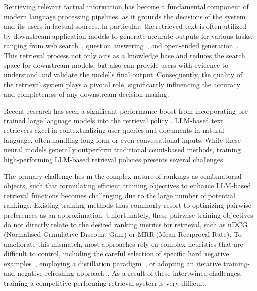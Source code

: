 \documentclass{article}
\begin{document}
Retrieving relevant factual information has become a fundamental component of modern language processing pipelines, as it grounds the decisions of the system and its users in factual sources. In particular, the retrieved text is often utilized by downstream application models to generate accurate outputs for various tasks, ranging from web search~\citep{Huang2013LearningDS}, question answering~\citep[]{Voorhees1999TheTQ, Chen2017ReadingWT, Karpukhin2020DensePR}, and open-ended generation~\citep{Lewis2020RetrievalAugmentedGF, Paranjape2021HindsightPT, Yu2022RetrievalaugmentedGA}.
This retrieval process not only acts as a knowledge base and reduces the search space for downstream models, but also can provide users with evidence to understand and validate the model's final output. Consequently, the quality of the retrieval system plays a pivotal role, significantly influencing the accuracy and completeness of any downstream decision making.

Recent research has seen a significant performance boost from incorporating pre-trained large language models into the retrieval policy \citep[e.g.,][]{Nogueira2019PassageRW, Lin2020PretrainedTF, Karpukhin2020DensePR}.
LLM-based text retrievers excel in contextualizing user queries and documents in natural language, often handling long-form or even conversational inputs. While these neural models generally outperform traditional count-based methods, training high-performing LLM-based retrieval policies presents several challenges. 


The primary challenge lies in the complex nature of rankings as combinatorial objects, such that formulating efficient training objectives to enhance LLM-based retrieval functions becomes challenging due to the large number of potential rankings. Existing training methods thus commonly resort to optimizing pairwise preferences as an approximation. Unfortunately, these pairwise training objectives do not directly relate to the desired ranking metrics for retrieval, such as nDCG (Normalised Cumulative Discount Gain) or MRR (Mean Reciprocal Rate). To ameliorate this mismatch, most approaches rely on complex heuristics that are difficult to control, including the careful selection of specific hard negative examples~\citep{Xiong2020ApproximateNN}, employing a distillation paradigm~\citep{Qu2020RocketQAAO, Yang2020NeuralRF}, or adopting an iterative training-and-negative-refreshing approach~\citep{Sun2022ReduceCF}. 
As a result of these intertwined challenges, training a competitive-performing retrieval system is very difficult.
\end{document}
